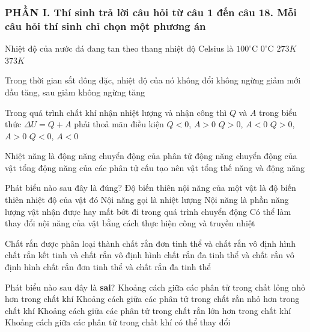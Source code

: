 \subsubsection*{PHẦN I. Thí sinh trả lời câu hỏi từ câu 1 đến câu 18. Mỗi câu hỏi thí sinh chỉ chọn một phương án}
\setcounter{ex}{0}
\begin{ex} %
	Nhiệt độ của nước đá đang tan theo thang nhiệt độ Celsius là
	\choice
	{$100^\circ\text{C}$}
	{\True $0^\circ\text{C}$}
	{$273K$}
	{$373K$}
	\loigiai{}
\end{ex}

\begin{ex} %
	Trong thời gian sắt đông đặc, nhiệt độ của nó
	\choice
	{\True không đổi}
	{không ngừng giảm}
	{mới đầu tăng, sau giảm}
	{không ngừng tăng}
	\loigiai{}
\end{ex}

\begin{ex} %
	Trong quá trình chất khí nhận nhiệt lượng và nhận công thì $Q$ và $A$ trong biểu thức $\Delta U = Q + A$ phải thoả mãn điều kiện
	\choice
	{$Q < 0$, $A > 0$}
	{$Q > 0$, $A < 0$}
	{\True $Q > 0$, $A > 0$}
	{$Q < 0$, $A < 0$}
	\loigiai{}
\end{ex}

\begin{ex} %
	Nhiệt năng là
	\choice
	{động năng chuyển động của phân tử}
	{động năng chuyển động của vật}
	{\True tổng động năng của các phân tử cấu tạo nên vật}
	{tổng thế năng và động năng}
	\loigiai{}
\end{ex}

\begin{ex} %
Phát biểu nào sau đây là đúng?
	\choice
	{Độ biến thiên nội năng của một vật là độ biến thiên nhiệt độ của vật đó}
	{Nội năng gọi là nhiệt lượng}
	{Nội năng là phần năng lượng vật nhận được hay mất bớt đi trong quá trình chuyển động}
	{\True Có thể làm thay đổi nội năng của vật bằng cách thực hiện công và truyền nhiệt}
	\loigiai{}
\end{ex}

\begin{ex} %
	Chất rắn được phân loại thành
	\choice
	{chất rắn đơn tinh thể và chất rắn vô định hình}
	{\True chất rắn kết tinh và chất rắn vô định hình}
	{chất rắn đa tinh thể và chất rắn vô định hình}
	{chất rắn đơn tinh thể và chất rắn đa tinh thể}
	\loigiai{}
\end{ex}

\begin{ex} %
Phát biểu nào sau đây là \textbf{sai}?
	\choice
	{Khoảng cách giữa các phân tử trong chất lỏng nhỏ hơn trong chất khí}
	{Khoảng cách giữa các phân tử trong chất rắn nhỏ hơn trong chất khí}
	{\True Khoảng cách giữa các phân tử trong chất rắn lớn hơn trong chất khí}
	{Khoảng cách giữa các phân tử trong chất khí có thể thay đổi}
	\loigiai{}
\end{ex}

